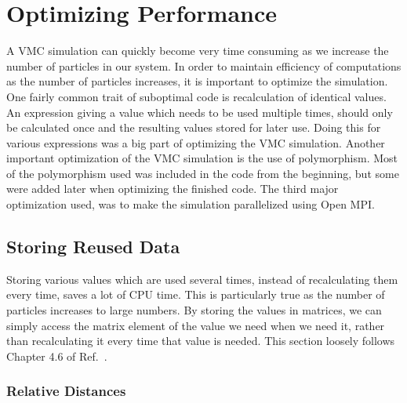 \documentclass[../main.tex]{subfiles}
\begin{document}



\chapter{Optimizing Performance}

A VMC simulation can quickly become very time consuming as we increase the number of particles in our system. In order to maintain efficiency of computations as the number of particles increases, it is important to optimize the simulation. One fairly common trait of suboptimal code is recalculation of identical values. An expression giving a value which needs to be used multiple times, should only be calculated once and the resulting values stored for later use. Doing this for various expressions was a big part of optimizing the VMC simulation. Another important optimization of the VMC simulation is the use of polymorphism. Most of the polymorphism used was included in the code from the beginning, but some were added later when optimizing the finished code. The third major optimization used, was to make the simulation parallelized using Open MPI\cite{Open MPI}.

\section{Storing Reused Data}

Storing various values which are used several times, instead of recalculating them every time, saves a lot of CPU time. This is particularly true as the number of particles increases to large numbers. By storing the values in matrices, we can simply access the matrix element of the value we need when we need it, rather than recalculating it every time that value is needed. This section loosely follows Chapter 4.6 of Ref.~\cite{Jorgen}.

\subsection{Relative Distances}
\end{document}
